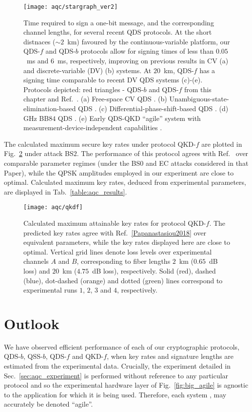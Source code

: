 \begin{figure}[htp]
\centering
\texttt{[image: aqc/stargraph\_ver2]}
\caption{\label{fig:aqc_star} Time required to sign a one-bit message, and the corresponding channel lengths, for several recent QDS protocols. At the short distnaces ($\sim 2$~km) favoured by the continuous-variable platform, our QDS-$f$ and QDS-$b$ protocols allow for signing times of less than $0.05$~ms and $6$~ms, respectively, improving on previous results in CV (a) and discrete-variable (DV) (b) systems. At $20$~km, QDS-$f$ has a signing time comparable to recent DV QDS systems (c)-(e). Protocols depicted: red triangles - QDS-$b$ and QDS-$f$ from this chapter and Ref.~\cite{Richter2020}. (a) Free-space CV QDS \cite{Croal2016}. (b) Unambiguous-state-elimination-based QDS \cite{Donaldson2016}. (c) Differential-phase-shift-based QDS \cite{Collins2016}. (d) GHz BB$84$ QDS \cite{An2019}. (e) Early QDS-QKD ``agile'' system with measurement-device-independent capabilities \cite{Roberts2017}.}
\end{figure}


The calculated maximum secure key rates under protocol QKD-$f$ are plotted in Fig.~\ref{fig:aqc_qkdf} under attack BS$2$. The performance of this protocol agrees with Ref.~\cite{Papanastasiou2018} over comparable parameter regimes (under the BS$0$ and EC attacks considered in that Paper), while the QPSK amplitudes employed in our experiment are close to optimal. Calculated maximum key rates, deduced from experimental parameters, are displayed in Tab.~\ref{table:aqc_results}.

\begin{figure}[htp]
\centering
\texttt{[image: aqc/qkdf]}
\caption{\label{fig:aqc_qkdf} Calculated maximum attainable key rates for protocol QKD-$f$. The predicted key rates agree with Ref.~\ref{Papanastasiou2018} over equivalent parameters, while the key rates displayed here are close to optimal. Vertical grid lines denote loss levels over experimental channels $A$ and $B$, corresponding to fiber lengths $2$~km ($0.65$~dB loss) and $20$~km ($4.75$~dB loss), respectively. Solid (red), dashed (blue), dot-dashed (orange) and dotted (green) lines correspond to experimental runs $1$, $2$, $3$ and $4$, respectively.}
\end{figure}



\section{Outlook}
We have observed efficient performance of each of our cryptographic protocols, QDS-$b$, QSS-$b$, QDS-$f$ and QKD-$f$, when key rates and signature lengths are estimated from the experimental data. Crucially, the experiment detailed in Sec.~\ref{sec:aqc_experiment} is performed without reference to any particular protocol and so the experimental hardware layer of Fig.~\ref{fig:big_agile} is agnostic to the application for which it is being used. Therefore, each system \systemB, \systemF may accurately be denoted ``agile''.

